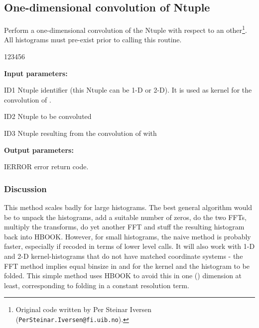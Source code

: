\subsection*{One-dimensional convolution of Ntuple}


\Action
Perform a one-dimensional convolution of the Ntuple with
respect to an other\footnote{%
Original code written by
Per Steinar Iversen  (\texttt{PerSteinar.Iversen@fi.uib.no}).}.
All histograms must pre-exist prior to calling this routine.

\begin{DLttc}{123456}
\item[{\rm\bf Input parameters:}]
\item[ID1] Ntuple identifier (this Ntuple can be 1-D or 2-D).
           It is used as kernel for the convolution of .
\item[ID2] Ntuple to be convoluted
\item[ID3] Ntuple resulting from the convolution of
            with 
\item[{\rm\bf Output parameters:}]
\item[IERROR] error return code.
\end{DLttc}

\subsubsection*{Discussion}

This method scales badly for large histograms. The best general
algorithm would be to unpack the histograms, add a suitable number
of zeros, do the two FFTs, multiply the transforms, do yet
another FFT and stuff the resulting histogram back into HBOOK.
However, for small histograms, the naive method is probably faster,
especially if recoded in terms of lower level calls. It will also
work with 1-D and 2-D kernel-histograms that do not have matched
coordinate systems - the FFT method implies equal binsize in 
and  for the kernel and the histogram to be folded.
This simple method uses HBOOK to avoid this in one
() dimension at least, corresponding
to folding in a constant resolution term.

